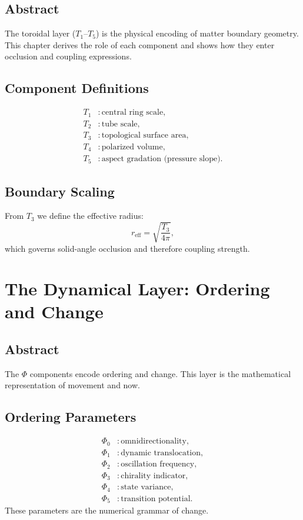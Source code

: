 \documentclass[12pt]{book}
\begin{document}
\section*{Abstract}
The toroidal layer ($T_1$–$T_5$) is the physical encoding of matter boundary geometry. This chapter
derives the role of each component and shows how they enter occlusion and coupling expressions.

\section{Component Definitions}
\begin{align}
T_1 &: \text{central ring scale},\\
T_2 &: \text{tube scale},\\
T_3 &: \text{topological surface area},\\
T_4 &: \text{polarized volume},\\
T_5 &: \text{aspect gradation (pressure slope)}.
\end{align}

\section{Boundary Scaling}
From $T_3$ we define the effective radius:
\begin{equation}
r_{\text{eff}} = \sqrt{\frac{T_3}{4\pi}},
\end{equation}
which governs solid-angle occlusion and therefore coupling strength.

\chapter{The Dynamical Layer: Ordering and Change}

\section*{Abstract}
The $\Phi$ components encode ordering and change. This layer is the mathematical representation of
movement and now.

\section{Ordering Parameters}
\begin{align}
\Phi_0 &: \text{omnidirectionality},\\
\Phi_1 &: \text{dynamic translocation},\\
\Phi_2 &: \text{oscillation frequency},\\
\Phi_3 &: \text{chirality indicator},\\
\Phi_4 &: \text{state variance},\\
\Phi_5 &: \text{transition potential}.
\end{align}
These parameters are the numerical grammar of change.
\end{document}
